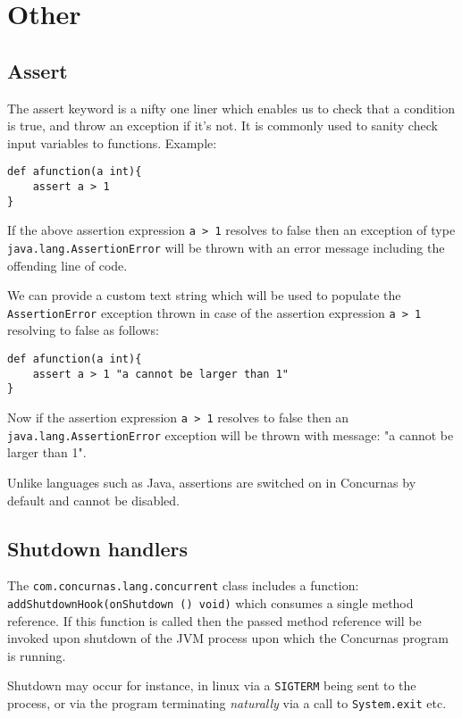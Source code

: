 \documentclass[conc-doc]{subfiles}
\begin{document}
	
	\chapter[Other]{Other}
	
\section{Assert}
The assert keyword is a nifty one liner which enables us to check that a condition is true, and throw an exception if it's not. It is commonly used to sanity check input variables to functions. Example:
\begin{lstlisting}
def afunction(a int){
	assert a > 1
}
\end{lstlisting}

If the above assertion expression \lstinline{a > 1} resolves to false then an exception of type \lstinline{java.lang.AssertionError} will be thrown with an error message including the offending line of code.

We can provide a custom text string which will be used to populate the \lstinline{AssertionError} exception thrown in case of the assertion expression \lstinline{a > 1} resolving to false as follows:
\begin{lstlisting}
def afunction(a int){
	assert a > 1 "a cannot be larger than 1"
}
\end{lstlisting}

Now if the assertion expression \lstinline{a > 1} resolves to false then an \lstinline{java.lang.AssertionError} exception will be thrown with message: "a cannot be larger than 1".

Unlike languages such as Java, assertions are switched on in Concurnas by default and cannot be disabled.

\section{Shutdown handlers}
\label{sec:shutdownHandle}
The \lstinline{com.concurnas.lang.concurrent} class includes a function: \lstinline{addShutdownHook(onShutdown () void)} which consumes a single method reference. If this function is called then the passed method reference will be invoked upon shutdown of the JVM process upon which the Concurnas program is running.

Shutdown may occur for instance, in linux via a \lstinline{SIGTERM} being sent to the process, or via the program terminating \textit{naturally} via a call to \lstinline{System.exit} etc.
\end{document}
